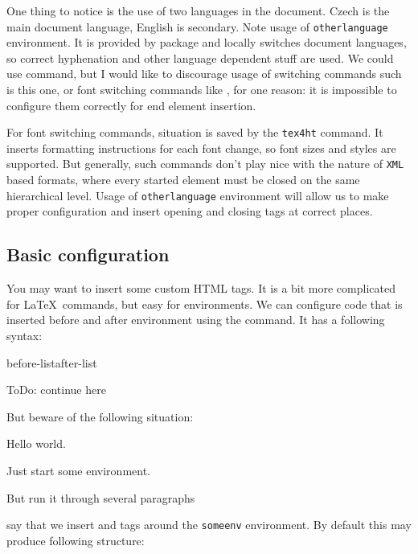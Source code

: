 One thing to notice is the use of two languages in the document. 
Czech is the main document language, English is secondary. 
Note usage of \texttt{otherlanguage} environment. 
It is provided by  package and locally
switches document languages, so correct hyphenation and other language
dependent stuff are used. We could use
\texcommand{\selectlanguage} command, but I would like to
discourage usage of switching commands such is this one, or font
switching commands like \texcommand{\bfseries}, for one
reason: it is impossible to configure them correctly for end element
insertion. 

For font switching commands, situation is saved by the
\texttt{tex4ht} command. It inserts formatting instructions for each
font change, so font sizes and styles are supported. 
But generally, such commands don't play nice with the nature of
\texttt{XML} based formats, where every started element must be closed
on the same hierarchical level. 
Usage of \texttt{otherlanguage} environment will allow us to make proper
configuration and insert opening and closing tags at correct places.

\subsection{Basic configuration}

You may want to insert some custom HTML tags. It is a bit more complicated for
\LaTeX\ commands, but easy for environments. We can configure code that is 
inserted before and after environment using the \texcommand{\ConfigureEnv} command.
It has a following syntax:

\begin{texsource}
{before-list}{after-list}
\end{texsource}

ToDo: continue here


But beware of the following situation:

\begin{texsource}
Hello world.
\begin{someenv}
Just start some environment.

But run it through several paragraphs
\end{someenv}
\end{texsource}

say that we insert
 and
 tags around  the \texttt{someenv}
environment. By default this may produce following structure:

